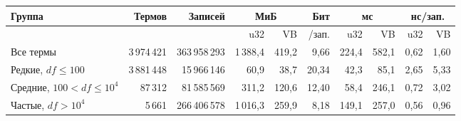 \begin{tabular}{|p{}|r|r|r|r|r|r|r|r|r|}
\hline
Группа & Термов & Записей & \multicolumn{2}{c|}{МиБ} & Бит & \multicolumn{2}{c|}{мс} & \multicolumn{2}{c|}{нс/зап.} \\
\hline
 &  &  & u32 & VB & /зап. & u32 & VB & u32 & VB \\
\hline
Все термы & 3\,974\,421 & 363\,958\,293 & 1\,388,4 & 419,2 & 9,66 & 224,4 & 582,1 & 0,62 & 1,60 \\
\hline
Редкие, $df \le 100$ & 3\,881\,448 & 15\,966\,146 & 60,9 & 38,7 & 20,34 & 42,3 & 85,1 & 2,65 & 5,33 \\
\hline
Средние, $100 < df \le 10^4$ & 87\,312 & 81\,585\,569 & 311,2 & 120,6 & 12,40 & 58,4 & 246,1 & 0,72 & 3,02 \\
\hline
Частые, $df > 10^4$ & 5\,661 & 266\,406\,578 & 1\,016,3 & 259,9 & 8,18 & 149,1 & 257,0 & 0,56 & 0,96 \\
\hline
\end{tabular}
